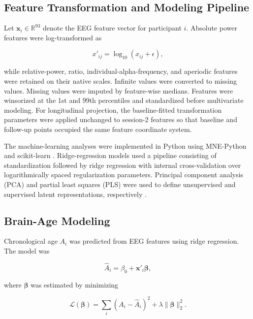 \documentclass[journal]{IEEEtran}
\begin{document}
\subsection{Feature Transformation and Modeling Pipeline}

Let $\mathbf{x}_i \in \mathbb{R}^{93}$ denote the EEG feature vector for participant $i$. Absolute power features were log-transformed as

\begin{equation}
x'_{ij}=\log_{10}(x_{ij}+\epsilon),
\end{equation}

while relative-power, ratio, individual-alpha-frequency, and aperiodic features were retained on their native scales. Infinite values were converted to missing values. Missing values were imputed by feature-wise medians. Features were winsorized at the 1st and 99th percentiles and standardized before multivariate modeling. For longitudinal projection, the baseline-fitted transformation parameters were applied unchanged to session-2 features so that baseline and follow-up points occupied the same feature coordinate system.

The machine-learning analyses were implemented in Python using MNE-Python and scikit-learn \cite{gramfort2013meg,pedregosa2011scikit}. Ridge-regression models used a pipeline consisting of standardization followed by ridge regression with internal cross-validation over logarithmically spaced regularization parameters. Principal component analysis (PCA) and partial least squares (PLS) were used to define unsupervised and supervised latent representations, respectively \cite{jolliffe2002principal,wold2001pls}.

\subsection{Brain-Age Modeling}

Chronological age $A_i$ was predicted from EEG features using ridge regression. The model was

\begin{equation}
\hat{A}_i = \beta_0 + \mathbf{x}'_i\boldsymbol{\beta},
\end{equation}

where $\boldsymbol{\beta}$ was estimated by minimizing

\begin{equation}
\mathcal{L}(\boldsymbol{\beta}) =
\sum_i (A_i-\hat{A}_i)^2+\lambda\|\boldsymbol{\beta}\|_2^2.
\end{equation}
\end{document}
